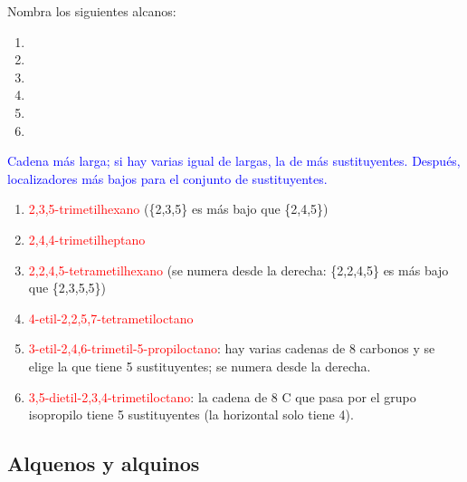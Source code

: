 \begin{exercise}
    Nombra los siguientes alcanos:
    \begin{enumerate}[label=\alph*)]
        \item {}
        \item {}
        \item {}
        \item {}
        \item {}
        \item {}
    \end{enumerate}
    \begin{solu}
        \textcolor{blue}{Cadena más larga; si hay varias igual de largas, la de más sustituyentes. Después, localizadores más bajos para el conjunto de sustituyentes.}
        \begin{enumerate}[label=\alph*)]
            \item \textcolor{red}{2,3,5-trimetilhexano} (\{2,3,5\} es más bajo que \{2,4,5\})
            \item \textcolor{red}{2,4,4-trimetilheptano}
            \item \textcolor{red}{2,2,4,5-tetrametilhexano} (se numera desde la derecha: \{2,2,4,5\} es más bajo que \{2,3,5,5\})
            \item \textcolor{red}{4-etil-2,2,5,7-tetrametiloctano}
            \item \textcolor{red}{3-etil-2,4,6-trimetil-5-propiloctano}: hay varias cadenas de 8 carbonos y se elige la que tiene 5 sustituyentes; se numera desde la derecha.
            \item \textcolor{red}{3,5-dietil-2,3,4-trimetiloctano}: la cadena de 8 C que pasa por el grupo isopropilo tiene 5 sustituyentes (la horizontal solo tiene 4).
        \end{enumerate}
    \end{solu}
\end{exercise}

\subsection*{Alquenos y alquinos}

